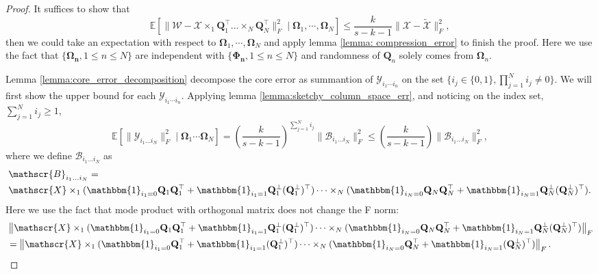 \begin{proof}
It suffices to show that 
\begin{equation}
\mathbb{E}\left[ \|\mathscr{W} - \mathscr{X}\times_1 \mathbf{Q}_1^\top \dots \times_N \mathbf{Q}_N^\top\|_F^2 \mid \mathbf{\Omega}_1, \cdots, \mathbf{\Omega}_N \right] \le \frac{k}{s-k-1}  \|\mathscr{X} - \tilde{\mathscr{X}}\|_F^2, 
\end{equation}
then we could take an expectation with respect to $\mathbf{\Omega}_1, \cdots,  \mathbf{\Omega}_N$ and apply lemma \ref{lemma: compression_error} to finish the proof. Here we use the fact that $\{\mathbf{\Omega_n}, 1\le n\le N\}$ are independent with $\{\mathbf{\Phi_n}, 1\le n\le N\}$ and randomness of $\mathbf{Q}_n$ solely comes from $\mathbf{\Omega}_n$. \par 
Lemma \ref{lemma:core_error_decomposition} decompose the core error as summantion of $\mathscr{Y}_{i_1\cdots i_n}$ on the set $\{i_j\in \{0,1\}, \prod_{j=1}^N i_j \neq 0\}$. We will first show the upper bound for each $\mathscr{Y}_{i_1\cdots i_n}$. Applying lemma \ref{lemma:sketchy_column_space_err}, and noticing on the index set, $\sum_{j=1}^N i_j \ge 1$,  
\begin{equation}
\mathbb{E} \left[ \|\mathscr{Y}_{i_1\dots i_N}\|_F^2 \mid \mathbf{\Omega}_1 \cdots \mathbf{\Omega}_N \right] = \left(\frac{k}{s-k-1}\right)^{\sum_{j=1}^N i_j} \|\mathscr{B}_{i_1\dots i_N}\|_F^2 \le \left(\frac{k}{s-k-1}\right) \|\mathscr{B}_{i_1\dots i_N}\|_F^2,
\end{equation}
where we define $\mathscr{B}_{i_1\dots i_N}$ as
\begin{equation}
\begin{aligned}
&\mathscr{B}_{i_1\dots i_N} = \\
&\mathscr{X}\times_1 (\mathbbm{1}_{i_1=0}\mathbf{Q}_1\mathbf{Q}_1^\top + \mathbbm{1}_{i_1=1}\mathbf{Q}_1^\bot(\mathbf{Q}_1^\bot)^\top)\cdots\times_N(\mathbbm{1}_{i_N=0}\mathbf{Q}_N\mathbf{Q}_N^\top + \mathbbm{1}_{i_N=1}\mathbf{Q}_N^\bot(\mathbf{Q}_N^\bot)^\top).
\end{aligned}
\end{equation}
Here we use the fact that mode product with orthogonal matrix does not change the F norm:
\begin{equation}
\begin{aligned}
&\left\|\mathscr{X}\times_1 (\mathbbm{1}_{i_1=0}\mathbf{Q}_1\mathbf{Q}_1^\top + \mathbbm{1}_{i_1=1}\mathbf{Q}_1^\bot(\mathbf{Q}_1^\bot)^\top)\cdots\times_N(\mathbbm{1}_{i_N=0}\mathbf{Q}_N\mathbf{Q}_N^\top + \mathbbm{1}_{i_N=1}\mathbf{Q}_N^\bot(\mathbf{Q}_N^\bot)^\top)\right\|_F \\
&= \left\|\mathscr{X}\times_1 (\mathbbm{1}_{i_1=0}\mathbf{Q}_1^\top + \mathbbm{1}_{i_1=1}(\mathbf{Q}_1^\bot)^\top)\cdots\times_N(\mathbbm{1}_{i_N=0}\mathbf{Q}_N^\top + \mathbbm{1}_{i_N=1}(\mathbf{Q}_N^\bot)^\top)\right\|_F.
\end{aligned}
\end{equation}


\end{proof}
